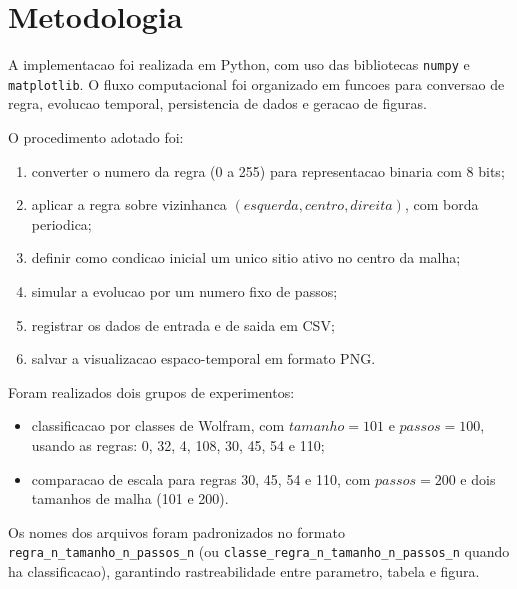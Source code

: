 \chapter{Metodologia}
\label{chap_metodologia}

A implementacao foi realizada em Python, com uso das bibliotecas \texttt{numpy} e \texttt{matplotlib}. O fluxo computacional foi organizado em funcoes para conversao de regra, evolucao temporal, persistencia de dados e geracao de figuras.

O procedimento adotado foi:
\begin{enumerate}
    \item converter o numero da regra (0 a 255) para representacao binaria com 8 bits;
    \item aplicar a regra sobre vizinhanca \((esquerda, centro, direita)\), com borda periodica;
    \item definir como condicao inicial um unico sitio ativo no centro da malha;
    \item simular a evolucao por um numero fixo de passos;
    \item registrar os dados de entrada e de saida em CSV;
    \item salvar a visualizacao espaco-temporal em formato PNG.
\end{enumerate}

Foram realizados dois grupos de experimentos:
\begin{itemize}
    \item classificacao por classes de Wolfram, com \(tamanho=101\) e \(passos=100\), usando as regras: 0, 32, 4, 108, 30, 45, 54 e 110;
    \item comparacao de escala para regras 30, 45, 54 e 110, com \(passos=200\) e dois tamanhos de malha (101 e 200).
\end{itemize}

Os nomes dos arquivos foram padronizados no formato \texttt{regra\_n\_tamanho\_n\_passos\_n} (ou \texttt{classe\_regra\_n\_tamanho\_n\_passos\_n} quando ha classificacao), garantindo rastreabilidade entre parametro, tabela e figura.

